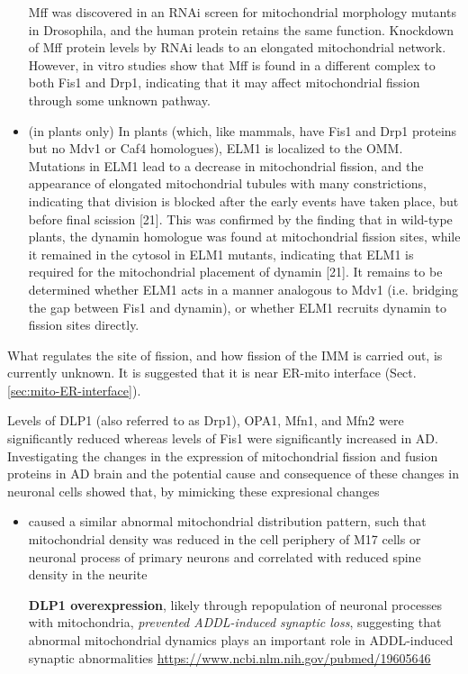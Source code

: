 \begin{itemize}
   Mff was discovered in an RNAi screen for mitochondrial morphology mutants in
   Drosophila, and the human protein retains the same function.
   Knockdown of Mff protein levels by RNAi leads to an elongated mitochondrial
   network.
   However, in vitro studies show that Mff is found in a different complex to
   both Fis1 and Drp1, indicating that it may affect mitochondrial fission
   through some unknown pathway.
   
   
   \item (in plants only) In plants (which, like mammals, have Fis1 and Drp1
   proteins but no Mdv1 or Caf4 homologues), ELM1 is localized to the OMM.
   Mutations in ELM1 lead to a decrease in mitochondrial fission, and the
   appearance of elongated mitochondrial tubules with many constrictions,
   indicating that division is blocked after the early events have taken place,
   but before final scission [21]. This was confirmed by the finding that in
   wild-type plants, the dynamin homologue was found at mitochondrial fission
   sites, while it remained in the cytosol in ELM1 mutants, indicating that ELM1
   is required for the mitochondrial placement of dynamin [21]. It remains to be
   determined whether ELM1 acts in a manner analogous to Mdv1 (i.e. bridging the
   gap between Fis1 and dynamin), or whether ELM1 recruits dynamin to fission
   sites directly.
   
\end{itemize}

What regulates the site of fission, and how fission of the IMM is carried out, is currently unknown.
It is suggested that it is near ER-mito interface (Sect.\ref{sec:mito-ER-interface}).


Levels of DLP1 (also referred to as Drp1), OPA1, Mfn1, and Mfn2 were
significantly reduced whereas levels of Fis1 were significantly increased in AD.
Investigating the changes in the expression of mitochondrial fission and fusion
proteins in AD brain and the potential cause and consequence of these changes in
neuronal cells showed that, by mimicking these expresional changes
\begin{itemize}
  \item  caused a similar abnormal mitochondrial distribution pattern, such that
  mitochondrial density was reduced in the cell periphery of M17 cells or
  neuronal process of primary neurons and correlated with reduced spine density
  in the neurite  
  
  {\bf DLP1 overexpression}, likely through repopulation of neuronal processes
  with mitochondria, {\it prevented ADDL-induced synaptic loss}, suggesting that
  abnormal mitochondrial dynamics plays an important role in ADDL-induced
  synaptic abnormalities  
  \url{https://www.ncbi.nlm.nih.gov/pubmed/19605646}
\end{itemize}

